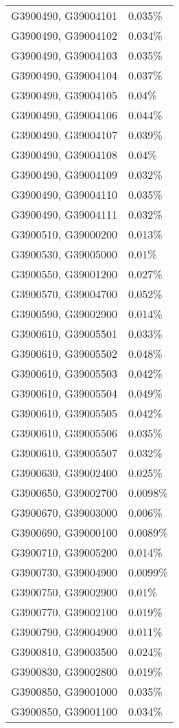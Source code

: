 \begin{longtable}[]{@{}ll@{}}
G3900490, G39004101 & 0.035\% \\
G3900490, G39004102 & 0.034\% \\
G3900490, G39004103 & 0.035\% \\
G3900490, G39004104 & 0.037\% \\
G3900490, G39004105 & 0.04\% \\
G3900490, G39004106 & 0.044\% \\
G3900490, G39004107 & 0.039\% \\
G3900490, G39004108 & 0.04\% \\
G3900490, G39004109 & 0.032\% \\
G3900490, G39004110 & 0.035\% \\
G3900490, G39004111 & 0.032\% \\
G3900510, G39000200 & 0.013\% \\
G3900530, G39005000 & 0.01\% \\
G3900550, G39001200 & 0.027\% \\
G3900570, G39004700 & 0.052\% \\
G3900590, G39002900 & 0.014\% \\
G3900610, G39005501 & 0.033\% \\
G3900610, G39005502 & 0.048\% \\
G3900610, G39005503 & 0.042\% \\
G3900610, G39005504 & 0.049\% \\
G3900610, G39005505 & 0.042\% \\
G3900610, G39005506 & 0.035\% \\
G3900610, G39005507 & 0.032\% \\
G3900630, G39002400 & 0.025\% \\
G3900650, G39002700 & 0.0098\% \\
G3900670, G39003000 & 0.006\% \\
G3900690, G39000100 & 0.0089\% \\
G3900710, G39005200 & 0.014\% \\
G3900730, G39004900 & 0.0099\% \\
G3900750, G39002900 & 0.01\% \\
G3900770, G39002100 & 0.019\% \\
G3900790, G39004900 & 0.011\% \\
G3900810, G39003500 & 0.024\% \\
G3900830, G39002800 & 0.019\% \\
G3900850, G39001000 & 0.035\% \\
G3900850, G39001100 & 0.034\% \\

\end{longtable}

